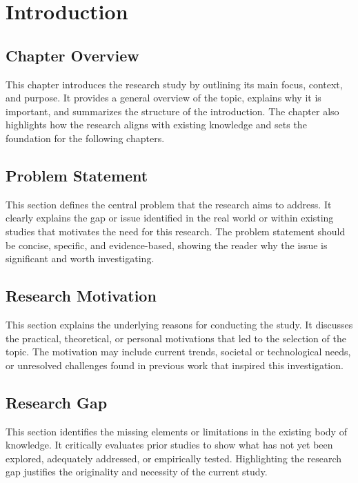 \documentclass[12pt,a4paper]{report}
\begin{document}
\clearpage
{}
\setcounter{page}{1}
\chapter{Introduction}

\section{Chapter Overview}
This chapter introduces the research study by outlining its main focus, context, and purpose. 
It provides a general overview of the topic, explains why it is important, and summarizes the structure of the introduction. 
The chapter also highlights how the research aligns with existing knowledge and sets the foundation for the following chapters.

\section{Problem Statement}
This section defines the central problem that the research aims to address. 
It clearly explains the gap or issue identified in the real world or within existing studies that motivates the need for this research. 
The problem statement should be concise, specific, and evidence-based, showing the reader why the issue is significant and worth investigating.

\section{Research Motivation}
This section explains the underlying reasons for conducting the study. 
It discusses the practical, theoretical, or personal motivations that led to the selection of the topic. 
The motivation may include current trends, societal or technological needs, or unresolved challenges found in previous work that inspired this investigation.

\section{Research Gap}
This section identifies the missing elements or limitations in the existing body of knowledge. 
It critically evaluates prior studies to show what has not yet been explored, adequately addressed, or empirically tested. 
Highlighting the research gap justifies the originality and necessity of the current study.
\end{document}
